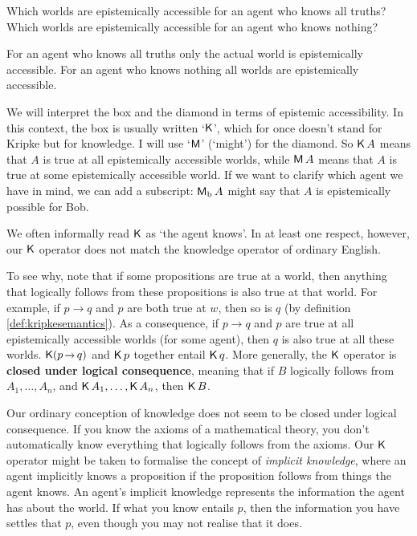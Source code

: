 \begin{exercise}
  Which worlds are epistemically accessible for an agent who knows all truths?
  Which worlds are epistemically accessible for an agent who knows nothing?
\end{exercise}
\begin{solution}
  For an agent who knows all truths only the actual world is epistemically accessible. For an agent who knows nothing all worlds are epistemically accessible.
\end{solution}

We will interpret the box and the diamond in terms of epistemic accessibility.
In this context, the box is usually written `$\operatorname{\mathsf{K}{}}$', which for once doesn't
stand for Kripke but for knowledge. I will use `$\operatorname{\mathsf{M}}$' (`might') for the
diamond. So $\operatorname{\mathsf{K}{}} A$ means that $A$ is true at all epistemically accessible
worlds, while $\operatorname{\mathsf{M}} A$ means that $A$ is true at some epistemically accessible
world. If we want to clarify which agent we have in mind, we can add a
subscript: $\operatorname{\mathsf{M}}_{\text{b}} A$ might say that $A$ is epistemically possible for
Bob.

We often informally read $\operatorname{\mathsf{K}{}}$ as `the agent knows'. In at least one respect,
however, our $\operatorname{\mathsf{K}{}}$ operator does not match the knowledge operator of ordinary
English.

To see why, note that if some propositions are true at a world, then anything
that logically follows from these propositions is also true at that world. For
example, if $p\to q$ and $p$ are both true at $w$, then so is $q$ (by definition
\ref{def:kripkesemantics}). As a consequence, if $p \to q$ and $p$ are true at
all epistemically accessible worlds (for some agent), then $q$ is also true at
all these worlds. $\Kn (p\to q)$ and $\operatorname{\mathsf{K}{}} p$ together entail $\operatorname{\mathsf{K}{}} q$. More
generally, the $\operatorname{\mathsf{K}{}}$ operator is \textbf{closed under logical consequence},
meaning that if $B$ logically follows from $A_1,\ldots,A_n$, and
$\operatorname{\mathsf{K}{}} A_1, \ldots,\operatorname{\mathsf{K}{}} A_n$, then $\operatorname{\mathsf{K}{}} B$.

Our ordinary conception of knowledge does not seem to be closed under logical
consequence. If you know the axioms of a mathematical theory, you don't
automatically know everything that logically follows from the axioms. Our $\operatorname{\mathsf{K}{}}$
operator might be taken to formalise the concept of \emph{implicit knowledge},
where an agent implicitly knows a proposition if the proposition follows from
things the agent knows. An agent's implicit knowledge represents the information
the agent has about the world. If what you know entails $p$, then the
information you have settles that $p$, even though you may not realise that it
does.

